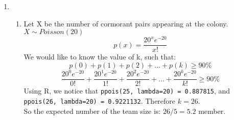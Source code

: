 \documentclass[11pt]{article}
\begin{document}
\begin{enumerate}[label=\textbf{Question \arabic*:},start=1]
\begin{enumerate}
  \item {\em [Optional bonus question]} 
\textbf{Proof:}\\
\begin{equation}
\begin{split}
\lim_{N\rightarrow\infty} \frac { {m \choose x}{N-m \choose n-x}}{ {N\choose n}} & = \lim_{N\rightarrow\infty} \frac { \frac{m!}{x!(m-x)!} \cdot \frac{(N-m)!}{(n-x)!(N-m-(n-x))!}}{ \frac{N!}{n!(N-n)!} } \\
& = \lim_{N\rightarrow\infty} \frac{n!}{x!(n-x)!} \cdot \frac{m! (N-m)! (N-n)!}{(m-x)! (N-m - (n-x))! N!} \\
& = \frac{n!}{x!(n-x)!}  \lim_{N\rightarrow\infty} \frac{(m-x+1)...m \cdot (N-m-(n-x)+1)...(N-m)}{(N-n+1)...N} \\
& = \frac{n!}{x!(n-x)!}  (\frac{m}{N})^x (\frac{N-m}{N})^{n-x} \\
& = {n \choose x} p^x (1-p)^{n-x}
\end{split}
\end{equation}

line 1 just expand the combinations. \\
line 2 rearranges the division and pulls out  $\frac{n!}{x!(n-x)!}$ \\
line 3 cancels same items in $m!$ with $(m-x)!$,  $(N-m)!$ with $(N-m-(n-x))!$, $N!$ with $(N-n)!$. \\
line 4, notice that there are $x$ items in $(m-x+1)...m$, and there are $(n-x)$ items in $(N-m-(n-x)+1)...(N-m)$, and there are $n$ items in $(N-n+1)...N$, also $n = x + n-x$. So when we take the limit, we can replace all items in $(m-x+1)...m$ with $m^x$, $(N-m-(n-x)+1)...(N-m)$ with $(N-m)^{n-x}$, $(N-n+1)...N$ with $N^x N^{n-x}$ because they are asymptotically equivalent when taking the limit. Therefore we get the result in line 4. \\
line 5, notice that expression in line 4 is just the expanded form of line 5, after replacing $\frac{m}{N}$ with $p$.\\
Q.E.D.

\end{enumerate}




\vspace*{3mm}

\item 
\begin{enumerate}
\item
Let X be the number of cormorant pairs appearing at the colony. \( X \sim Poisson(20) \) \\
\[
p(x) = \frac{20^x e^{-20}}{x!}
\]
We would like to know the value of k, such that:
\[
p(0) + p(1) + p(2) + ... +  p(k) \geq 90\%
\]
\[
\frac{20^0 e^{-20}}{0!} + \frac{20^1 e^{-20}}{1!} + \frac{20^2 e^{-20}}{2!} + ... + \frac{20^k e^{-20}}{k!} \geq 90\%
\]
Using R, we notice that \texttt{ppois(25, lambda=20) = 0.887815}, and \texttt{ppois(26, lambda=20) = 0.9221132}. Therefore $k = 26$. \\
So the expected number of the team size is: $26/5 = 5.2$ member.\\


\end{enumerate}
\end{enumerate}
\end{document}
